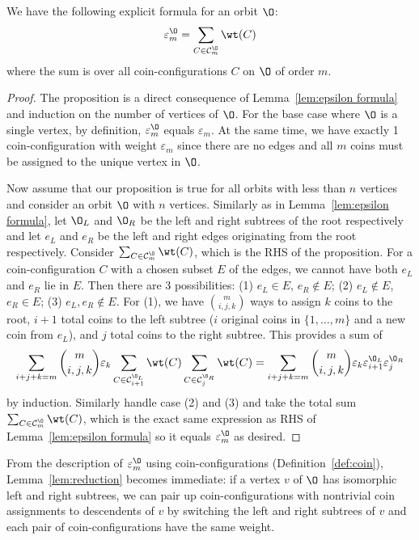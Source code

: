 \begin{proposition}\label{prop:coin}
We have the following explicit formula for an orbit $\O$:
$$\varepsilon_m^{\O}=\sum_{C\in\mathcal{C}^{\O}_m}\wt(C)$$
where the sum is over all coin-configurations $C$ on $\O$ of order $m$.
\end{proposition}
\begin{proof}
The proposition is a direct consequence of Lemma~\ref{lem:epsilon formula} and induction on the number of vertices of $\O$. For the base case where $\O$ is a single vertex, by definition, $\varepsilon^{\O}_m$ equals $\varepsilon_m$. At the same time, we have exactly 1 coin-configuration with weight $\varepsilon_m$ since there are no edges and all $m$ coins must be assigned to the unique vertex in $\O$.

Now assume that our proposition is true for all orbits with less than $n$ vertices and consider an orbit $\O$ with $n$ vertices. Similarly as in Lemma~\ref{lem:epsilon formula}, let $\O_L$ and $\O_R$ be the left and right subtrees of the root respectively and let $e_L$ and $e_R$ be the left and right edges originating from the root respectively. Consider $\sum_{C\in\mathcal{C}^{\O}_m}\wt(C)$, which is the RHS of the proposition. For a coin-configuration $C$ with a chosen subset $E$ of the edges, we cannot have both $e_L$ and $e_R$ lie in $E$. Then there are 3 possibilities: (1) $e_L\in E$, $e_R\notin E$; (2) $e_L\notin E$, $e_R\in E$; (3) $e_L,e_R\notin E$. For (1), we have $\binom{m}{i,j,k}$ ways to assign $k$ coins to the root, $i+1$ total coins to the left subtree ($i$ original coins in $\{1,\ldots,m\}$ and a new coin from $e_L$), and $j$ total coins to the right subtree. This provides a sum of $$\sum_{i+j+k=m}\binom{m} {i,j,k}\varepsilon_k\sum_{C\in\mathcal{C}^{\O_L}_{i+1}}\wt(C)\sum_{C\in\mathcal{C}^{\O_R}_{j}}\wt(C)=\sum_{i+j+k=m}\binom{m} {i,j,k}\varepsilon_k\varepsilon_{i+1}^{\O_L}\varepsilon_{j}^{\O_R}$$
by induction. Similarly handle case (2) and (3) and take the total sum $\sum_{C\in\mathcal{C}^{\O}_m}\wt(C)$, which is the exact same expression as RHS of Lemma~\ref{lem:epsilon formula} so it equals $\varepsilon_m^{\O}$ as desired.
\end{proof}

From the description of $\varepsilon_m^{\O}$ using coin-configurations (Definition~\ref{def:coin}), Lemma~\ref{lem:reduction} becomes immediate: if a vertex $v$ of $\O$ has isomorphic left and right subtrees, we can pair up coin-configurations with nontrivial coin assignments to descendents of $v$ by switching the left and right subtrees of $v$ and each pair of coin-configurations have the same weight.